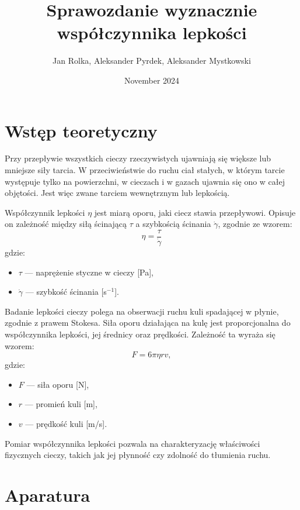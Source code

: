 \documentclass{article}
\title{Sprawozdanie wyznacznie współczynnika lepkości}
\author{Jan Rolka, Aleksander Pyrdek, Aleksander Mystkowski}
\date{November 2024}
\begin{document}
\maketitle
\newpage

\section{Wstęp teoretyczny}

\vspace{0.5cm}

Przy przepływie wszystkich cieczy rzeczywistych ujawniają się większe lub mniejsze siły tarcia. W przeciwieństwie do ruchu ciał stałych, w którym tarcie występuje tylko na powierzchni, w cieczach i w gazach ujawnia się ono w całej objętości. Jest więc zwane tarciem wewnętrznym lub lepkością.

\vspace{0.5cm}

Współczynnik lepkości \(\eta\) jest miarą oporu, jaki ciecz stawia przepływowi. Opisuje on zależność między siłą ścinającą \(\tau\) a szybkością ścinania \(\dot{\gamma}\), zgodnie ze wzorem:
\[
\eta = \frac{\tau}{\dot{\gamma}}
\]
gdzie:
\begin{itemize}
    \item \(\tau\) — naprężenie styczne w cieczy [Pa],
    \item \(\dot{\gamma}\) — szybkość ścinania [s\(^{-1}\)].
\end{itemize}

\vspace{0.5cm}

Badanie lepkości cieczy polega na obserwacji ruchu kuli spadającej w płynie, zgodnie z prawem Stokesa. Siła oporu działająca na kulę jest proporcjonalna do współczynnika lepkości, jej średnicy oraz prędkości. Zależność ta wyraża się wzorem:
\[
F = 6 \pi \eta r v,
\]
gdzie:
\begin{itemize}
    \item \(F\) — siła oporu [N],
    \item \(r\) — promień kuli [m],
    \item \(v\) — prędkość kuli [m/s].
\end{itemize}

\vspace{0.5cm}

Pomiar współczynnika lepkości pozwala na charakteryzację właściwości fizycznych cieczy, takich jak jej płynność czy zdolność do tłumienia ruchu.


\section{Aparatura}
\end{document}
